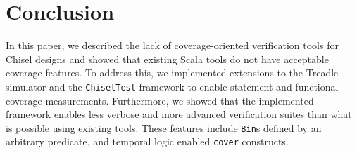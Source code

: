 \documentclass[conference]{IEEEtran}
\newcommand{\andrew}[1]{{\color{red} Andrew: #1}}
\newcommand{\hjd}[1]{{\color{pink} Hans: #1}}
\begin{document}
\section{Conclusion}

In this paper, we described the lack of coverage-oriented verification tools 
for Chisel designs and showed that existing Scala tools do not have acceptable coverage features. To 
address this, we implemented extensions to the Treadle simulator and the \texttt{ChiselTest} framework 
to enable statement and functional coverage measurements. Furthermore, we showed that the implemented 
framework enables less verbose and more advanced verification suites than what is possible using existing tools. 
These features include \texttt{Bin}s defined by an arbitrary predicate, and temporal logic enabled \texttt{cover} constructs. 
\end{document}
